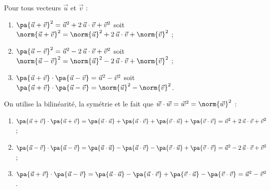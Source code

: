 \begin{prop}
	Pour tous vecteurs $\vec{u}$ et $\vec{v}$ :
	\begin{enumerate}
		\item $\pa{\vec{u} + \vec{v}}^2 = \vec{u}^2 + 2\,\vec{u}\cdot\vec{v} + \vec{v}^2$ \quad soit \quad $\norm{\vec{u} + \vec{v}}^2 = \norm{\vec{u}}^2 + 2\,\vec{u}\cdot\vec{v} + \norm{\vec{v}}^2$ ;
		\item $\pa{\vec{u} - \vec{v}}^2 = \vec{u}^2 - 2\,\vec{u}\cdot\vec{v} + \vec{v}^2$ \quad soit \quad $\norm{\vec{u} - \vec{v}}^2 = \norm{\vec{u}}^2 - 2\,\vec{u}\cdot\vec{v} + \norm{\vec{v}}^2$ ;
		\item $\pa{\vec{u} + \vec{v}}\cdot\pa{\vec{u} - \vec{v}} = \vec{u}^2 - \vec{v}^2$ \quad soit \quad $\pa{\vec{u} + \vec{v}}\cdot\pa{\vec{u} - \vec{v}} = \norm{\vec{u}}^2 - \norm{\vec{v}}^2$.
	\end{enumerate}
\end{prop}

\begin{demo}
	On utilise la bilinéarité, la symétrie et le fait que $\vec{w}\cdot\vec{w} = \vec{w}^2 = \norm{\vec{w}}^2$ :
	\begin{enumerate}
		\item $\pa{\vec{u} + \vec{v}}\cdot\pa{\vec{u} + \vec{v}} = \pa{\vec{u}\cdot\vec{u}} + \pa{\vec{u}\cdot\vec{v}} + \pa{\vec{v}\cdot\vec{u}} + \pa{\vec{v}\cdot\vec{v}} = \vec{u}^2 + 2\,\vec{u}\cdot\vec{v} + \vec{v}^2$ ;
		\item $\pa{\vec{u} - \vec{v}}\cdot\pa{\vec{u} - \vec{v}} = \pa{\vec{u}\cdot\vec{u}} - \pa{\vec{u}\cdot\vec{v}} - \pa{\vec{v}\cdot\vec{u}} + \pa{\vec{v}\cdot\vec{v}} = \vec{u}^2 - 2\,\vec{u}\cdot\vec{v} + \vec{v}^2$ ;
		\item $\pa{\vec{u} + \vec{v}}\cdot\pa{\vec{u} - \vec{v}} = \pa{\vec{u}\cdot\vec{u}} - \pa{\vec{u}\cdot\vec{v}} + \pa{\vec{v}\cdot\vec{u}} - \pa{\vec{v}\cdot\vec{v}} = \vec{u}^2 - \vec{v}^2$.
	\end{enumerate}
\end{demo}

